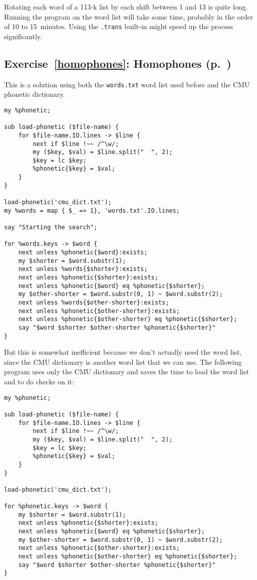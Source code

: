 Rotating each word of a 113-k list by each shift between 
1 and 13 is quite long. Running the program on the word list 
will take some time, probably in the order of 10 to 15~minutes.
Using the \verb'.trans' built-in might speed up the process 
significantly.

\subsection{Exercise~\ref{homophones}: Homophones (p.~\pageref{homophones})}
\label{sol_homophones}

This is a solution using both the {\tt words.txt} word list 
used before and the CMU phonetic dictionary.

\begin{verbatim}
my %phonetic;

sub load-phonetic ($file-name) {
    for $file-name.IO.lines -> $line {
        next if $line !~~ /^\w/; 
        my ($key, $val) = $line.split("  ", 2);
        $key = lc $key;
        %phonetic{$key} = $val;
    }
}

load-phonetic('cmu_dict.txt');
my %words = map { $_ => 1}, 'words.txt'.IO.lines;

say "Starting the search";

for %words.keys -> $word {
    next unless %phonetic{$word}:exists;
    my $shorter = $word.substr(1);
    next unless %words{$shorter}:exists;
    next unless %phonetic{$shorter}:exists;
    next unless %phonetic{$word} eq %phonetic{$shorter};
    my $other-shorter = $word.substr(0, 1) ~ $word.substr(2);
    next unless %words{$other-shorter}:exists;
    next unless %phonetic{$other-shorter}:exists;
    next unless %phonetic{$other-shorter} eq %phonetic{$shorter};
    say "$word $shorter $other-shorter %phonetic{$shorter}"
}
\end{verbatim}

But this is somewhat inefficient because we don't actually 
need the word list, since the CMU dictionary is another 
word list that we can use. The following program uses 
only the CMU dictionary and saves the time to load the 
word list and to do checks on it:

\begin{verbatim}
my %phonetic;

sub load-phonetic ($file-name) {
    for $file-name.IO.lines -> $line {
        next if $line !~~ /^\w/; 
        my ($key, $val) = $line.split("  ", 2);
        $key = lc $key;
        %phonetic{$key} = $val;
    }
}

load-phonetic('cmu_dict.txt');

for %phonetic.keys -> $word {
    my $shorter = $word.substr(1);
    next unless %phonetic{$shorter}:exists;
    next unless %phonetic{$word} eq %phonetic{$shorter};
    my $other-shorter = $word.substr(0, 1) ~ $word.substr(2);
    next unless %phonetic{$other-shorter}:exists;
    next unless %phonetic{$other-shorter} eq %phonetic{$shorter};
    say "$word $shorter $other-shorter %phonetic{$shorter}"
}
\end{verbatim}

